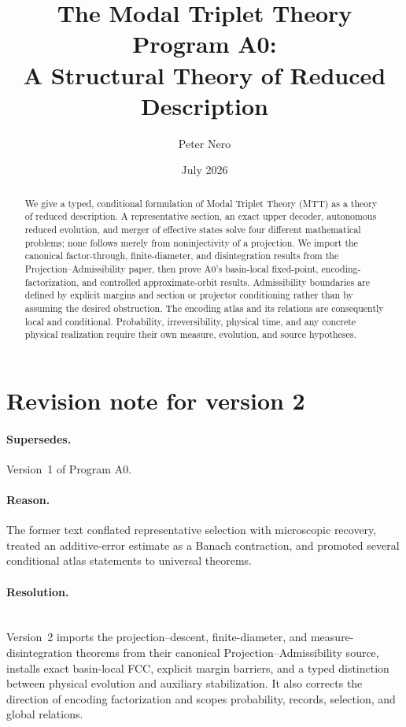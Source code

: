 \documentclass[11pt]{article}
\title{The Modal Triplet Theory Program A0:\\ A Structural Theory of Reduced Description}
\author{Peter Nero}
\date{July 2026}
\theoremstyle{plain}
\theoremstyle{plain}
\begin{document}
\maketitle

\begin{abstract}
We give a typed, conditional formulation of Modal Triplet Theory (MTT) as a
theory of reduced description.  A representative section, an exact upper
decoder, autonomous reduced evolution, and merger of effective states solve
four different mathematical problems; none follows merely from
noninjectivity of a projection.  We import the canonical factor-through,
finite-diameter, and disintegration results from the
Projection--Admissibility paper, then prove A0's basin-local fixed-point,
encoding-factorization, and controlled approximate-orbit results.
Admissibility boundaries are defined by explicit margins and section or
projector conditioning rather than by assuming the desired obstruction.  The
encoding atlas and its relations are consequently local and conditional.
Probability, irreversibility, physical time, and any concrete physical
realization require their own measure, evolution, and source hypotheses.
\end{abstract}

\section*{Revision note for version 2}
\paragraph{Supersedes.}
Version~1 of Program A0.
\paragraph{Reason.}
The former text conflated representative selection with
microscopic recovery, treated an additive-error estimate as a Banach
contraction, and promoted several conditional atlas statements to universal
theorems.
\paragraph{Resolution.}\mbox{}\\
Version~2 imports the projection--descent, finite-diameter, and
measure-disintegration theorems from their canonical
Projection--Admissibility source, installs exact basin-local FCC, explicit
margin barriers, and a typed distinction between
physical evolution and auxiliary stabilization.  It also corrects the
direction of encoding factorization and scopes probability, records,
selection, and global relations.
\end{document}

